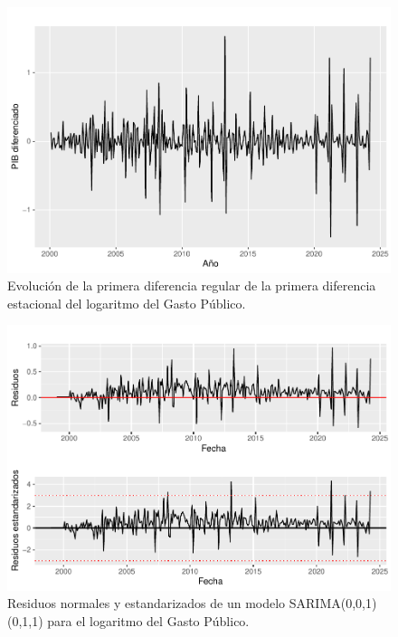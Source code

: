\documentclass[
  12pt,
]{article}
\begin{document}
\begin{figure}[H]

{\centering \includegraphics[width=0.75\linewidth]{informe_files/figure-latex/unnamed-chunk-25-1} 

}

\caption{\label{difdif-est-gasto} Evolución de la primera diferencia regular de la primera diferencia estacional del logaritmo del Gasto Público.}\label{fig:unnamed-chunk-25}
\end{figure}

\begin{figure}[H]

{\centering \includegraphics[width=0.75\linewidth]{informe_files/figure-latex/unnamed-chunk-26-1} 

}

\caption{\label{residuos1} Residuos normales y estandarizados de un modelo SARIMA(0,0,1)(0,1,1) para el logaritmo del Gasto Público.}\label{fig:unnamed-chunk-26}
\end{figure}
\end{document}
